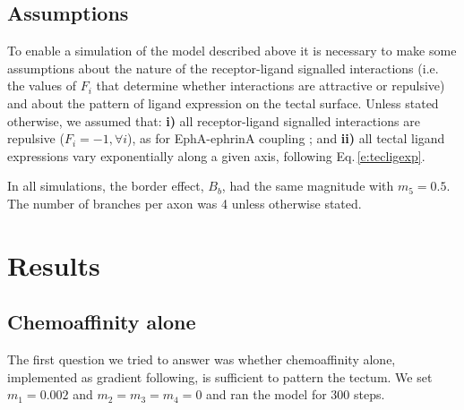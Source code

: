 \documentclass[11pt, a4paper]{article}
\begin{document}
\subsection*{Assumptions}

To enable a simulation of the model described above it is necessary to make
some assumptions about the nature of the receptor-ligand signalled
interactions (i.e. the values of $F_i$ that determine whether interactions are
attractive or repulsive) and about the pattern of ligand expression on the
tectal surface. Unless stated otherwise, we assumed that: \textbf{i)} all
receptor-ligand signalled interactions are repulsive ($F_i=-1, \forall i$), as
for EphA-ephrinA
coupling \citep{drescher_vitro_1995,nakamoto_topographically_1996};
and \textbf{ii)} all tectal ligand expressions vary exponentially along a
given axis, following Eq.\,\ref{e:tecligexp}.

In all simulations, the border effect, $B_b$, had the same magnitude with
$m_5=0.5$. The number of branches per axon was 4 unless otherwise stated.

\section{Results}

\subsection*{Chemoaffinity alone}

The first question we tried to answer was whether chemoaffinity alone,
implemented as gradient following, is sufficient to pattern the tectum. We set
$m_1=0.002$ and $m_2=m_3=m_4=0$ and ran the model for 300
steps.
\end{document}
